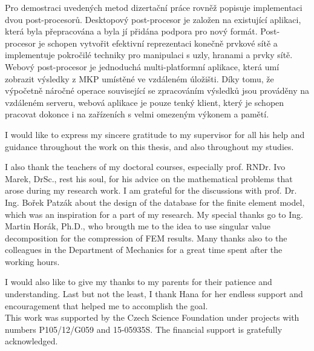 \documentclass[
11pt, %
english, %
singlespacing, %
headsepline, %
]{MastersDoctoralThesis} %
\begin{document}
\begin{abstractcs}
Pro demostraci uveden\'ych metod dizerta\v{c}n\'i pr\'ace rovn\v{e}\v{z} popisuje implementaci dvou post-procesor\r{u}. Desktopov\'y post-procesor je zalo\v{z}en na existuj\'ic\'i aplikaci, kter\'a byla p\v{r}epracov\'ana a byla j\'i p\v{r}id\'ana podpora pro nov\'y form\'at. Post-procesor je schopen vytvo\v{r}it efektivn\'i reprezentaci kone\v{c}n\v{e} prvkov\'e s\'it\v{e} a implementuje pokro\v{c}il\'e techniky pro manipulaci s uzly, hranami a prvky s\'it\v{e}. Webov\'y post-procesor je jednoduch\'a multi-platformn\'i aplikace, kter\'a um\'i zobrazit v\'ysledky z MKP um\'ist\v{e}n\'e ve vzd\'alen\'em \'ulo\v{z}i\v{s}ti. D\'iky tomu, \v{z}e v\'ypo\v{c}etn\v{e} n\'aro\v{c}n\'e operace souvisej\'ic\'i se zpracov\'an\'im v\'ysledk\r{u} jsou prov\'ad\v{e}ny na vzd\'alen\'em serveru, webov\'a aplikace je pouze tenk\'y klient, kter\'y je schopen pracovat dokonce i na za\v{r}\'izen\'ich s velmi omezen\'ym v\'ykonem a pam\v{e}t\'i.\\

\noindent
\textbf{\keywordstitlecs} \keywordnamescs
\end{abstractcs}


\begin{acknowledgements}
\addchaptertocentry{\acknowledgementname} %

I would like to express my sincere gratitude to my supervisor \supname{} for all his help and guidance throughout the work on this thesis, and also throughout my studies.

I also thank the teachers of my doctoral courses, especially prof. RNDr. Ivo Marek, DrSc., rest his soul, for his advice on the mathematical problems that arose during my research work. I am grateful for the discussions with prof. Dr. Ing. Bo\v{r}ek Patz\'ak about the design of the database for the finite element model, which was an inspiration for a part of my research. My special thanks go to Ing. Martin Hor\'ak, Ph.D., who brougth me to the idea to use singular value decomposition for the compression of FEM results. Many thanks also to the colleagues in the Department of Mechanics for a great time spent after the working hours.

I would also like to give my thanks to my parents for their patience and understanding. Last but not the least, I thank Hana for her endless support and encouragement that helped me to accomplish the goal.\\

This work was supported by the Czech Science Foundation under projects with numbers P105/12/G059 and 15-05935S. The financial support is gratefully acknowledged.


\end{acknowledgements}
\end{document}

